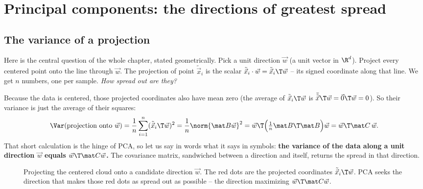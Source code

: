 \section{Principal components: the directions of greatest spread}

\subsection{The variance of a projection}

Here is the central question of the whole chapter, stated geometrically. Pick a
unit direction $\vec w$ (a unit vector in $\R^d$). Project every centered point
onto the line through $\vec w$. The projection of point $\tilde{\vec x}_i$ is the
scalar $\tilde{\vec x}_i\cdot\vec w = \tilde{\vec x}_i\T\vec w$ -- its signed
coordinate along that line. We get $n$ numbers, one per sample. \emph{How spread
out are they?}

Because the data is centered, those projected coordinates also have mean zero (the
average of $\tilde{\vec x}_i\T\vec w$ is $\bar{\tilde{\vec x}}\T\vec w=\vec 0\T\vec
w=0$). So their variance is just the average of their squares:
\[
  \Var(\text{projection onto }\vec w)
  =\frac1n\sum_{i=1}^n(\tilde{\vec x}_i\T\vec w)^2
  =\frac1n\norm{\mat B\vec w}^2
  =\vec w\T\Big(\tfrac1n\mat B\T\mat B\Big)\vec w
  =\vec w\T\mat C\,\vec w .
\]
That short calculation is the hinge of PCA, so let us say in words what it says in
symbols: \textbf{the variance of the data along a unit direction $\vec w$ equals
$\vec w\T\mat C\vec w$.} The covariance matrix, sandwiched between a direction and
itself, returns the spread in that direction.

\begin{figure}[H]
\centering
{}
\caption{Projecting the centered cloud onto a candidate direction $\vec w$. The red
dots are the projected coordinates $\tilde{\vec x}_i\T\vec w$. PCA seeks the
direction that makes those red dots as spread out as possible -- the direction
maximizing $\vec w\T\mat C\vec w$.}
\label{ch30:project}
\end{figure}


